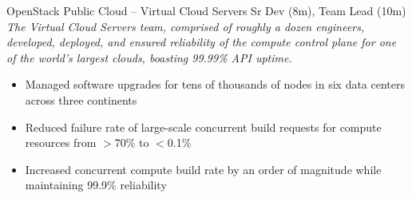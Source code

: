 \documentclass[margin,line]{resume}
\begin{document}
\begin{resume}
\begin{itemize}
\end{itemize}\vspace{-\baselineskip} %
\vspace{2pt}
{\small OpenStack Public Cloud -- Virtual Cloud Servers  \hfill  Sr Dev (8m), Team Lead (10m)}\\
{\small\textit{The Virtual Cloud Servers team, comprised of roughly a dozen engineers, developed, deployed, and
ensured reliability of the compute control plane for one of the world's largest clouds, boasting 99.99\% API uptime.}}
\begin{itemize} \itemsep -2pt %
\small\item Managed software upgrades for tens of thousands of nodes in six data centers across three continents
\small\item Reduced failure rate of large-scale concurrent build requests for compute resources from $>$70\% to $<$0.1\%
\small\item Increased concurrent compute build rate by an order of magnitude while maintaining 99.9\% reliability
\end{itemize}


\end{resume}
\end{document}

